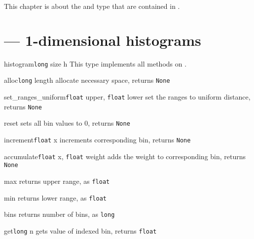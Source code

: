 
This chapter is about the  and  type that
are contained in .

\section{\protect{} --- 1-dimensional histograms}

\begin{classdesc}{histogram}{\texttt{long} size \code{|}  h}
This type implements all methods on .
\end{classdesc}

\begin{methoddesc}{alloc}{\texttt{long} length}
allocate necessary space, \hfill returns \texttt{None}
\end{methoddesc}
\begin{methoddesc}{set_ranges_uniform}{\texttt{float} upper, \texttt{float} lower}
set the ranges to uniform distance, \hfill returns \texttt{None}
\end{methoddesc}
\begin{methoddesc}{reset}{}
sets all bin values to 0, \hfill returns \texttt{None}
\end{methoddesc}
\begin{methoddesc}{increment}{\texttt{float} x}
increments corresponding bin, \hfill returns \texttt{None}
\end{methoddesc}
\begin{methoddesc}{accumulate}{\texttt{float} x, \texttt{float} weight}
adds the weight to corresponding bin, \hfill returns \texttt{None}
\end{methoddesc}
\begin{methoddesc}{max}{}
returns upper range, \hfill as \texttt{float}
\end{methoddesc}
\begin{methoddesc}{min}{}
returns lower range, \hfill as \texttt{float}
\end{methoddesc}
\begin{methoddesc}{bins}{}
returns number of bins, \hfill as \texttt{long}
\end{methoddesc}
\begin{methoddesc}{get}{\texttt{long} n}
gets value of indexed bin, \hfill returns \texttt{float}
\end{methoddesc}
